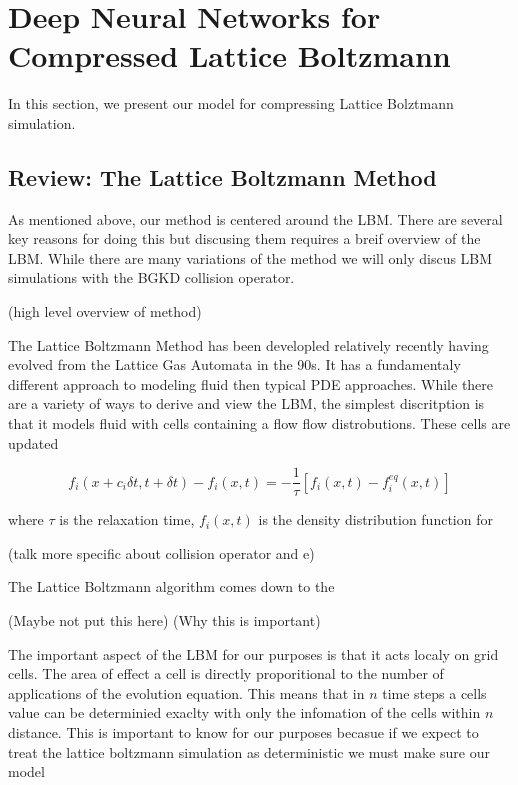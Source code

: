 \documentclass{article}
\begin{document}
\section{Deep Neural Networks for Compressed Lattice Boltzmann}

In this section, we present our model for compressing Lattice Bolztmann simulation.

\subsection{Review: The Lattice Boltzmann Method}

As mentioned above, our method is centered around the LBM. There are several key reasons for doing this but discusing them requires a breif overview of the LBM. While there are many variations of the method we will only discus LBM simulations with the BGKD collision operator. 

(high level overview of method)

The Lattice Boltzmann Method has been developled relatively recently having evolved from the Lattice Gas Automata in the 90s. It has a fundamentaly different approach to modeling fluid then typical PDE approaches. While there are a variety of ways to derive and view the LBM, the simplest discritption is that it models fluid with cells containing a flow flow distrobutions. These cells are updated 

\begin{equation}
  f_i(x+c_i \delta{t}, t+ \delta{t}) - f_i(x,t) = -\frac{1}{\tau} [f_i(x,t) - f_i^{eq}(x,t)]
\end{equation}

where $\tau$ is the relaxation time, $f_i(x,t)$ is the density distribution function for

(talk more specific about collision operator and e)

The Lattice Boltzmann algorithm comes down to the 

(Maybe not put this here)
(Why this is important)

The important aspect of the LBM for our purposes is that it acts localy on grid cells. The area of effect a cell is directly proporitional to the number of applications of the evolution equation. This means that in $n$ time steps a cells value can be determinied exaclty with only the infomation of the cells within $n$ distance. This is important to know for our purposes becasue if we expect to treat the lattice boltzmann simulation as deterministic we must make sure our model 
\end{document}
